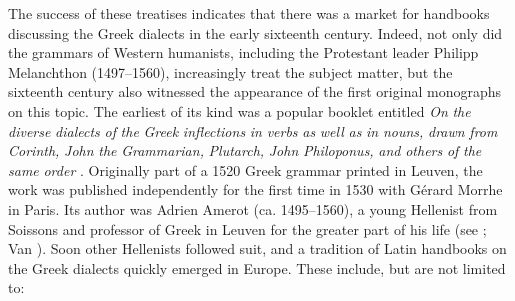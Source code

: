 The success of these treatises indicates that there was a market for handbooks discussing the Greek dialects in the early sixteenth century. Indeed, not only did the grammars of Western humanists, including the Protestant leader Philipp Melanchthon (1497–1560), increasingly treat the subject matter, but the sixteenth century also witnessed the appearance of the first original monographs on this topic. The earliest of its kind was a popular booklet entitled \textit{On} \textit{the} \textit{diverse} \textit{dialects} \textit{of} \textit{the} \textit{Greek} \textit{inflections} \textit{in} \textit{verbs} \textit{as} \textit{well} \textit{as} \textit{in} \textit{nouns,} \textit{drawn} \textit{from} \textit{Corinth,} \textit{John} \textit{the} \textit{Grammarian,} \textit{Plutarch,} \textit{John} \textit{Philoponus,} \textit{and} \textit{others} \textit{of} \textit{the} \textit{same} \textit{order} \citep{Amerot1530}. Originally part of a 1520 Greek grammar printed in Leuven, the work was published independently for the first time in 1530 with Gérard Morrhe in Paris. Its author was Adrien Amerot (ca. 1495–1560), a young Hellenist from Soissons and professor of Greek in Leuven for the greater part of his life (see \citealt{Hummel1999}; Van \citealt{Rooy2019}). Soon other Hellenists followed suit, and a tradition of Latin handbooks on the Greek dialects quickly emerged in Europe. These include, but are not limited to:

